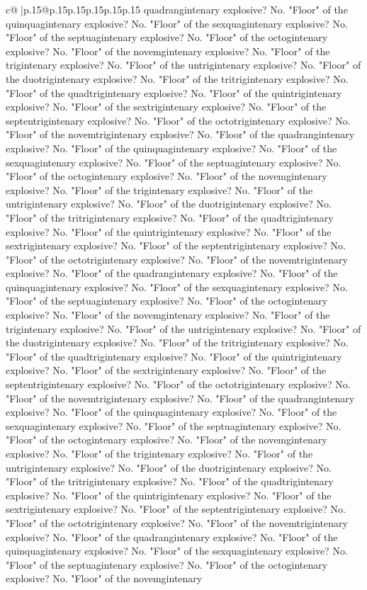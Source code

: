 \documentclass{article}
\begin{document}
{\begin{supertabular}{c@{$\;$}|p{.15\linewidth}@{}p{.15\linewidth}p{.15\linewidth}p{.15\linewidth}p{.15\linewidth}p{.15\linewidth}}
{{{quadrangintenary explosive? No. "Floor" of the quinquagintenary explosive? No. "Floor" of the sexquagintenary explosive? No. "Floor" of the septuagintenary explosive? No. "Floor" of the octogintenary explosive? No. "Floor" of the novemgintenary explosive? No. "Floor" of the trigintenary explosive? No. "Floor" of the untrigintenary explosive? No. "Floor" of the duotrigintenary explosive? No. "Floor" of the tritrigintenary explosive? No. "Floor" of the quadtrigintenary explosive? No. "Floor" of the quintrigintenary explosive? No. "Floor" of the sextrigintenary explosive? No. "Floor" of the septentrigintenary explosive? No. "Floor" of the octotrigintenary explosive? No. "Floor" of the novemtrigintenary explosive? No. "Floor" of the quadrangintenary explosive? No. "Floor" of the quinquagintenary explosive? No. "Floor" of the sexquagintenary explosive? No. "Floor" of the septuagintenary explosive? No. "Floor" of the octogintenary explosive? No. "Floor" of the novemgintenary explosive? No. "Floor" of the trigintenary explosive? No. "Floor" of the untrigintenary explosive? No. "Floor" of the duotrigintenary explosive? No. "Floor" of the tritrigintenary explosive? No. "Floor" of the quadtrigintenary explosive? No. "Floor" of the quintrigintenary explosive? No. "Floor" of the sextrigintenary explosive? No. "Floor" of the septentrigintenary explosive? No. "Floor" of the octotrigintenary explosive? No. "Floor" of the novemtrigintenary explosive? No. "Floor" of the quadrangintenary explosive? No. "Floor" of the quinquagintenary explosive? No. "Floor" of the sexquagintenary explosive? No. "Floor" of the septuagintenary explosive? No. "Floor" of the octogintenary explosive? No. "Floor" of the novemgintenary explosive? No. "Floor" of the trigintenary explosive? No. "Floor" of the untrigintenary explosive? No. "Floor" of the duotrigintenary explosive? No. "Floor" of the tritrigintenary explosive? No. "Floor" of the quadtrigintenary explosive? No. "Floor" of the quintrigintenary explosive? No. "Floor" of the sextrigintenary explosive? No. "Floor" of the septentrigintenary explosive? No. "Floor" of the octotrigintenary explosive? No. "Floor" of the novemtrigintenary explosive? No. "Floor" of the quadrangintenary explosive? No. "Floor" of the quinquagintenary explosive? No. "Floor" of the sexquagintenary explosive? No. "Floor" of the septuagintenary explosive? No. "Floor" of the octogintenary explosive? No. "Floor" of the novemgintenary explosive? No. "Floor" of the trigintenary explosive? No. "Floor" of the untrigintenary explosive? No. "Floor" of the duotrigintenary explosive? No. "Floor" of the tritrigintenary explosive? No. "Floor" of the quadtrigintenary explosive? No. "Floor" of the quintrigintenary explosive? No. "Floor" of the sextrigintenary explosive? No. "Floor" of the septentrigintenary explosive? No. "Floor" of the octotrigintenary explosive? No. "Floor" of the novemtrigintenary explosive? No. "Floor" of the quadrangintenary explosive? No. "Floor" of the quinquagintenary explosive? No. "Floor" of the sexquagintenary explosive? No. "Floor" of the septuagintenary explosive? No. "Floor" of the octogintenary explosive? No. "Floor" of the novemgintenary }}}
\end{supertabular}}
\end{document}
